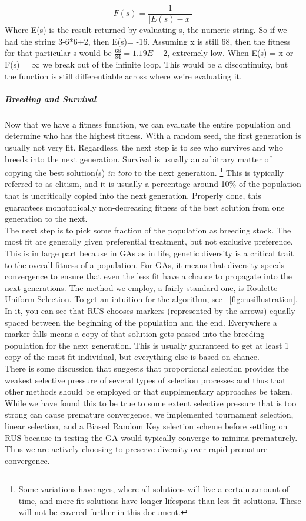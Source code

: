\begin{equation*}
F(s) = \frac{1}{|E(s)-x|}
\end{equation*}
Where E(s) is the result returned by evaluating s, the numeric string.  So if we had the string 3-6*6+2, then E(s)= -16.  Assuming x is still 68, then the fitness for that particular s would be \(\frac{68}{84}= 1.19E-2\), extremely low. When 
E(s) = x or F(s) = ${\infty}$
we break out of the infinite loop.  This would be a discontinuity, but the function is still differentiable across where we're evaluating it.
\subparagraph{Breeding and Survival}
Now that we have a fitness function, we can evaluate the entire population and determine who has the highest fitness.  With a random seed, the first generation is usually not very fit.  Regardless, the next step is to see who survives and who breeds into the next generation.
Survival is usually an arbitrary matter of copying the best solution(s) \textit{in toto} to the next generation.  \footnote{Some variations have ages, where all solutions will live a certain amount of time, and more fit solutions have longer lifespans than less fit solutions.  These will not be covered further in this document.}  This is typically referred to as elitism, and it is usually a percentage around 10\% of the population that is uncritically copied into the next generation.  Properly done, this guarantees monotonically non-decreasing fitness of the best solution from one generation to the next.\\
The next step is to pick some fraction of the population as breeding stock.  The most fit are generally given preferential treatment, but not exclusive preference.  This is in large part because in GAs as in life, genetic diversity is a critical trait to the overall fitness of a population.  For GAs, it means that diversity speeds convergence to ensure that even the less fit have a chance to propagate into the next generations.  The method we employ, a fairly standard one, is Roulette Uniform Selection.  To get an intuition for the algorithm, see ~\ref{fig:rusillustration}.  In it, you can see that RUS chooses markers (represented by the arrows) equally spaced between the beginning of the population and the end.  Everywhere a marker falls means a copy of that solution gets passed into the breeding population for the next generation.  This is usually guaranteed to get at least 1 copy of the most fit individual, but everything else is based on chance.  \\
There is some discussion that suggests that proportional selection provides the weakest selective pressure of several types of selection processes and thus that other methods should be employed or that supplementary approaches be taken\cite{back_selective_1994}. While we have found this to be true to some extent selective pressure that is too strong can cause premature convergence\cite{affenzeller_self-adaptive_2003}, we implemented tournament selection, linear selection, and a Biased Random Key selection scheme \cite{ruiz_biased_2015} before settling on RUS because in testing the GA would typically converge to minima prematurely.  Thus we are actively choosing to preserve diversity over rapid premature convergence.
